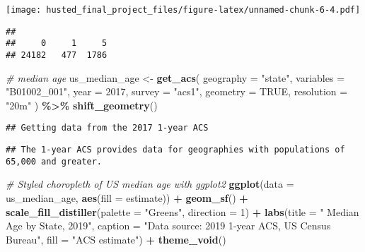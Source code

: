 \documentclass[
]{article}
\newenvironment{Shaded}{\begin{snugshade}}{\end{snugshade}}
\newcommand{\AttributeTok}[1]{\textcolor[rgb]{0.13,0.29,0.53}{#1}}
\newcommand{\CommentTok}[1]{\textcolor[rgb]{0.56,0.35,0.01}{\textit{#1}}}
\newcommand{\ConstantTok}[1]{\textcolor[rgb]{0.56,0.35,0.01}{#1}}
\newcommand{\DecValTok}[1]{\textcolor[rgb]{0.00,0.00,0.81}{#1}}
\newcommand{\FunctionTok}[1]{\textcolor[rgb]{0.13,0.29,0.53}{\textbf{#1}}}
\newcommand{\NormalTok}[1]{#1}
\newcommand{\OtherTok}[1]{\textcolor[rgb]{0.56,0.35,0.01}{#1}}
\newcommand{\SpecialCharTok}[1]{\textcolor[rgb]{0.81,0.36,0.00}{\textbf{#1}}}
\newcommand{\StringTok}[1]{\textcolor[rgb]{0.31,0.60,0.02}{#1}}
\begin{document}
\texttt{[image: husted\_final\_project\_files/figure-latex/unnamed-chunk-6-4.pdf]}

\begin{Shaded}
\end{Shaded}

\begin{verbatim}
## 
##     0     1     5 
## 24182   477  1786
\end{verbatim}

\begin{Shaded}
\begin{Highlighting}[]
\CommentTok{\# median age}
\NormalTok{us\_median\_age }\OtherTok{\textless{}{-}} \FunctionTok{get\_acs}\NormalTok{(}
  \AttributeTok{geography =} \StringTok{"state"}\NormalTok{,}
  \AttributeTok{variables =} \StringTok{"B01002\_001"}\NormalTok{,}
  \AttributeTok{year =} \DecValTok{2017}\NormalTok{,}
  \AttributeTok{survey =} \StringTok{"acs1"}\NormalTok{,}
  \AttributeTok{geometry =} \ConstantTok{TRUE}\NormalTok{,}
  \AttributeTok{resolution =} \StringTok{"20m"}
\NormalTok{) }\SpecialCharTok{\%\textgreater{}\%}
  \FunctionTok{shift\_geometry}\NormalTok{()}
\end{Highlighting}
\end{Shaded}

\begin{verbatim}
## Getting data from the 2017 1-year ACS
\end{verbatim}

\begin{verbatim}
## The 1-year ACS provides data for geographies with populations of 65,000 and greater.
\end{verbatim}

\begin{Shaded}
\begin{Highlighting}[]
 \CommentTok{\# Styled choropleth of US median age with ggplot2}
\FunctionTok{ggplot}\NormalTok{(}\AttributeTok{data =}\NormalTok{ us\_median\_age, }\FunctionTok{aes}\NormalTok{(}\AttributeTok{fill =}\NormalTok{ estimate)) }\SpecialCharTok{+} 
  \FunctionTok{geom\_sf}\NormalTok{() }\SpecialCharTok{+} 
  \FunctionTok{scale\_fill\_distiller}\NormalTok{(}\AttributeTok{palette =} \StringTok{"Greens"}\NormalTok{, }
                       \AttributeTok{direction =} \DecValTok{1}\NormalTok{) }\SpecialCharTok{+} 
  \FunctionTok{labs}\NormalTok{(}\AttributeTok{title =} \StringTok{"  Median Age by State, 2019"}\NormalTok{,}
       \AttributeTok{caption =} \StringTok{"Data source: 2019 1{-}year ACS, US Census Bureau"}\NormalTok{,}
       \AttributeTok{fill =} \StringTok{"ACS estimate"}\NormalTok{) }\SpecialCharTok{+} 
  \FunctionTok{theme\_void}\NormalTok{()}
\end{Highlighting}
\end{Shaded}
\end{document}
